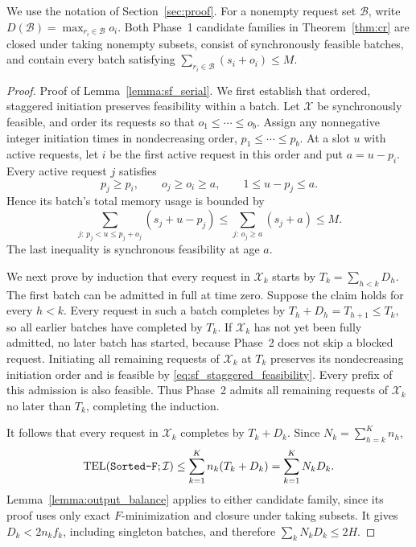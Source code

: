 \documentclass[nonblindrev]{informs3_hide}
\newcommand{\sortF}{\texttt{Sorted-F}}
\begin{document}
We use the notation of Section~\ref{sec:proof}. For a nonempty request set
$\mathcal B$, write $D(\mathcal B)=\max_{r_i\in\mathcal B}o_i$.
Both Phase~1 candidate families in Theorem~\ref{thm:cr} are closed under
taking nonempty subsets, consist of synchronously feasible batches, and
contain every batch satisfying
$\sum_{r_i\in\mathcal B}(s_i+o_i)\le M$.

\begin{proof}{Proof of Lemma~\ref{lemma:sf_serial}.}
We first establish that ordered, staggered initiation preserves feasibility
within a batch. Let $\mathcal X$ be synchronously feasible, and order its
requests so that $o_1\le\cdots\le o_b$. Assign any nonnegative integer initiation
times in nondecreasing order, $p_1\le\cdots\le p_b$. At a slot $u$ with active requests, let $i$ be
the first active request in this order and put $a=u-p_i$. Every active
request $j$ satisfies
\[
    p_j\ge p_i,\qquad o_j\ge o_i\ge a,
    \qquad 1\le u-p_j\le a.
\]
Hence its batch's total memory usage is bounded by
\begin{equation}
\label{eq:sf_staggered_feasibility}
    \sum_{j:\,p_j<u\le p_j+o_j}(s_j+u-p_j)
    \le\sum_{j:\,o_j\ge a}(s_j+a)
    \le M.
\end{equation}
The last inequality is synchronous feasibility at age $a$.

We next prove by induction that every request in $\mathcal X_k$ starts by
$T_k=\sum_{h<k}D_h$. The first batch can be admitted in full at time zero.
Suppose the claim holds for every $h<k$. Every request in such a batch
completes by $T_h+D_h=T_{h+1}\le T_k$, so all earlier batches have completed
by $T_k$. If $\mathcal X_k$ has not yet been fully admitted, no later batch
has started, because Phase~2 does not skip a blocked request. Initiating all
remaining requests of $\mathcal X_k$ at $T_k$ preserves its nondecreasing
initiation order and is feasible by \eqref{eq:sf_staggered_feasibility}.
Every prefix of this admission is also feasible. Thus Phase~2 admits all
remaining requests of $\mathcal X_k$ no later than $T_k$, completing the
induction.

It follows that every request in $\mathcal X_k$ completes by $T_k+D_k$.
Since $N_k=\sum_{h=k}^Kn_h$,
\[
    \mathrm{TEL}(\textup{\sortF};\mathcal I)
    \le\sum_{k=1}^K n_k(T_k+D_k)
    =\sum_{k=1}^K N_kD_k.
\]
Lemma~\ref{lemma:output_balance} applies to either candidate family, since
its proof uses only exact $F$-minimization and closure under taking subsets.
It gives $D_k<2n_kf_k$, including singleton batches, and therefore
$\sum_kN_kD_k\le2H$.
\Halmos
\end{proof}
\end{document}
